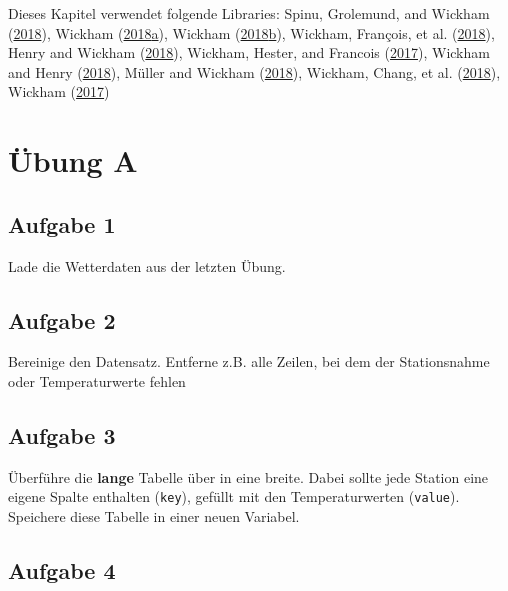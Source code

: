\documentclass[]{book}
\begin{document}
Dieses Kapitel verwendet folgende Libraries: Spinu, Grolemund, and Wickham (\protect\hyperlink{ref-R-lubridate}{2018}), Wickham (\protect\hyperlink{ref-R-forcats}{2018}\protect\hyperlink{ref-R-forcats}{a}), Wickham (\protect\hyperlink{ref-R-stringr}{2018}\protect\hyperlink{ref-R-stringr}{b}), Wickham, François, et al. (\protect\hyperlink{ref-R-dplyr}{2018}), Henry and Wickham (\protect\hyperlink{ref-R-purrr}{2018}), Wickham, Hester, and Francois (\protect\hyperlink{ref-R-readr}{2017}), Wickham and Henry (\protect\hyperlink{ref-R-tidyr}{2018}), Müller and Wickham (\protect\hyperlink{ref-R-tibble}{2018}), Wickham, Chang, et al. (\protect\hyperlink{ref-R-ggplot2}{2018}), Wickham (\protect\hyperlink{ref-R-tidyverse}{2017})

\hypertarget{ubung-a-1}{%
\section{Übung A}\label{ubung-a-1}}

\hypertarget{aufgabe-1-2}{%
\subsection{Aufgabe 1}\label{aufgabe-1-2}}

Lade die Wetterdaten aus der letzten Übung.

\hypertarget{aufgabe-2-2}{%
\subsection{Aufgabe 2}\label{aufgabe-2-2}}

Bereinige den Datensatz. Entferne z.B. alle Zeilen, bei dem der Stationsnahme oder Temperaturwerte fehlen

\hypertarget{aufgabe-3-2}{%
\subsection{Aufgabe 3}\label{aufgabe-3-2}}

Überführe die \textbf{lange} Tabelle über in eine breite. Dabei sollte jede Station eine eigene Spalte enthalten (\texttt{key}), gefüllt mit den Temperaturwerten (\texttt{value}). Speichere diese Tabelle in einer neuen Variabel.

\hypertarget{aufgabe-4-1}{%
\subsection{Aufgabe 4}\label{aufgabe-4-1}}
\end{document}
